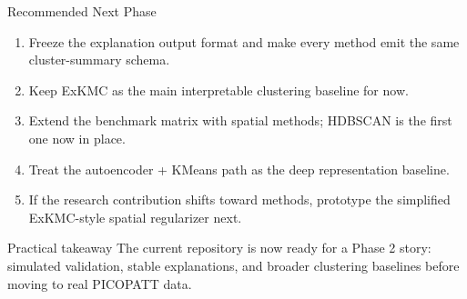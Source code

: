 \documentclass[aspectratio=169]{beamer}
\newcommand{\figureplaceholder}[2]{%
  \fbox{%
    \parbox{#1}{%
      \centering
      \vspace{#2}%
      \footnotesize\color{cmuted}Reserved for a relevant figure or image.\\[0.5em]%
      \color{ctext}Drop in the final visual here.%
      \vspace{#2}%
    }%
  }%
}
\begin{document}
\begin{frame}{Recommended Next Phase}
\begin{enumerate}
  \item Freeze the explanation output format and make every method emit the same cluster-summary schema.
  \item Keep ExKMC as the main interpretable clustering baseline for now.
  \item Extend the benchmark matrix with spatial methods; HDBSCAN is the first one now in place.
  \item Treat the autoencoder + KMeans path as the deep representation baseline.
  \item If the research contribution shifts toward methods, prototype the simplified ExKMC-style spatial regularizer next.
\end{enumerate}

\vspace{0.4em}
\begin{block}{Practical takeaway}
  The current repository is now ready for a Phase 2 story: simulated validation, stable explanations, and broader clustering baselines before moving to real PICOPATT data.
\end{block}
\end{frame}

%
\end{document}
